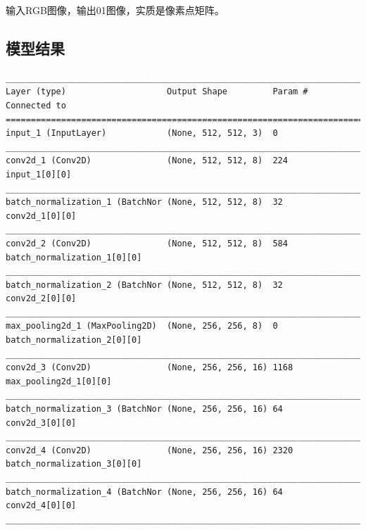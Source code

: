输入RGB图像，输出01图像，实质是像素点矩阵。

\subsection{模型结果}

\begin{lstlisting}[basicstyle=\tiny]
__________________________________________________________________________________________________
Layer (type)                    Output Shape         Param #     Connected to                     
==================================================================================================
input_1 (InputLayer)            (None, 512, 512, 3)  0                                            
__________________________________________________________________________________________________
conv2d_1 (Conv2D)               (None, 512, 512, 8)  224         input_1[0][0]                    
__________________________________________________________________________________________________
batch_normalization_1 (BatchNor (None, 512, 512, 8)  32          conv2d_1[0][0]                   
__________________________________________________________________________________________________
conv2d_2 (Conv2D)               (None, 512, 512, 8)  584         batch_normalization_1[0][0]      
__________________________________________________________________________________________________
batch_normalization_2 (BatchNor (None, 512, 512, 8)  32          conv2d_2[0][0]                   
__________________________________________________________________________________________________
max_pooling2d_1 (MaxPooling2D)  (None, 256, 256, 8)  0           batch_normalization_2[0][0]      
__________________________________________________________________________________________________
conv2d_3 (Conv2D)               (None, 256, 256, 16) 1168        max_pooling2d_1[0][0]            
__________________________________________________________________________________________________
batch_normalization_3 (BatchNor (None, 256, 256, 16) 64          conv2d_3[0][0]                   
__________________________________________________________________________________________________
conv2d_4 (Conv2D)               (None, 256, 256, 16) 2320        batch_normalization_3[0][0]      
__________________________________________________________________________________________________
batch_normalization_4 (BatchNor (None, 256, 256, 16) 64          conv2d_4[0][0]                   
__________________________________________________________________________________________________

\end{lstlisting}
